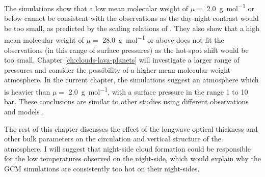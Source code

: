 The simulations show that a low mean molecular weight of $\mu =$ \SI{2.0}{\gram\per\mole} or below cannot be consistent with the observations as the day-night contrast would be too small, as predicted by the scaling relations of \citet{zhang2017dynamics}. They also show that a high mean molecular weight of $\mu=$ \SI{28.0}{\gram\per\mole} or above does not fit the observations (in this range of surface pressures) as the hot-spot shift would be too small. Chapter \ref{ch:clouds-lava-planets} will investigate a larger range of pressures and consider the possibility of a higher mean molecular weight atmosphere. In the current chapter, the simulations suggest an atmosphere which is heavier than $\mu=$ \SI{2.0}{\gram\per\mole}, with a surface pressure in the range 1 to 10 bar. These conclusions are similar to other studies using different observations and models \citep{winn2011super, angelo201755cnce}.

The rest of this chapter discusses the effect of the longwave optical thickness and other bulk parameters on the circulation and vertical structure of the atmosphere. I will suggest that night-side cloud formation could be responsible for the low temperatures observed on the night-side, which would explain why the GCM simulations are consistently too hot on their night-sides.


